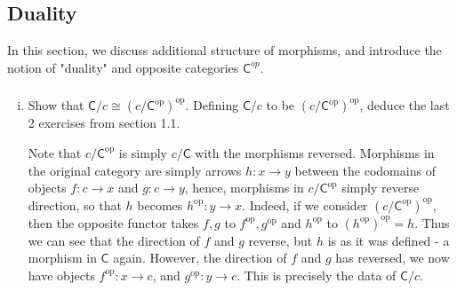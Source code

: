 \documentclass[10pt, oneside]{article}   	%
\newcommand{\cat}[1]{\bm{ \mathsf{#1} }}
\newcommand{\cc}{\cat{C}}
\newcommand{\op}[1]{#1^{\text{op}}}
\newcommand{\opc}{\op{\cc}}
\begin{document}
\subsection{Duality}

In this section, we discuss additional structure of morphisms, and introduce the notion of "duality" and opposite categories $\cc^{op}$. 

\subsubsection{}

\begin{enumerate}[(i)]
\item Show that $\cc/c \cong \op{(c /\opc)}$. Defining $\cc / c$ to be $\op{(c /\opc)}$, deduce the last 2 exercises from section 1.1.

Note that $c/\opc$ is simply $c / \cc$ with the morphisms reversed. Morphisms in the original category are simply arrows $h : x \to y$ between the codomains of objects $f :  c \to x$ and $g : c \to y$, hence, morphisms in $c / \opc$ simply reverse direction, so that $h$ becomes $\op{h}: y \to x$. Indeed, if we consider $\op{(c / \opc)}$, then the opposite functor takes $f,g$ to $\op{f}, \op{g}$ and $\op{h}$ to $\op{(\op{h})} = h$. Thus we can see that the direction of $f$ and $g$ reverse, but $h$ is as it was defined - a morphism in $\cc$ again. However, the direction of $f$ and $g$ has reversed, we now have objects $\op{f} : x \to c$, and $\op{g} : y \to c$. This is precisely the data of $\cc / c$. 
\end{enumerate}
\end{document}
